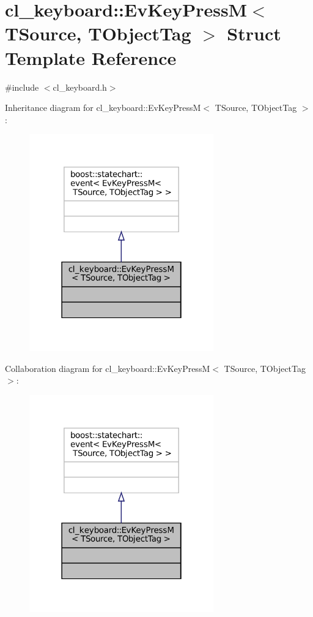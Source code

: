 \hypertarget{structcl__keyboard_1_1EvKeyPressM}{}\section{cl\+\_\+keyboard\+:\+:Ev\+Key\+PressM$<$ T\+Source, T\+Object\+Tag $>$ Struct Template Reference}
\label{structcl__keyboard_1_1EvKeyPressM}


{\ttfamily \#include $<$cl\+\_\+keyboard.\+h$>$}



Inheritance diagram for cl\+\_\+keyboard\+:\+:Ev\+Key\+PressM$<$ T\+Source, T\+Object\+Tag $>$\+:
\nopagebreak
\begin{figure}[H]
\begin{center}
\leavevmode
\includegraphics[width=226pt]{structcl__keyboard_1_1EvKeyPressM__inherit__graph}
\end{center}
\end{figure}


Collaboration diagram for cl\+\_\+keyboard\+:\+:Ev\+Key\+PressM$<$ T\+Source, T\+Object\+Tag $>$\+:
\nopagebreak
\begin{figure}[H]
\begin{center}
\leavevmode
\includegraphics[width=226pt]{structcl__keyboard_1_1EvKeyPressM__coll__graph}
\end{center}
\end{figure}



